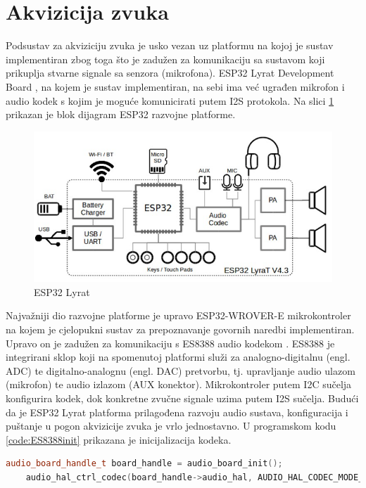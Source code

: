 \section{Akvizicija zvuka}
\label{sec:acq}

Podsustav za akviziciju zvuka je usko vezan uz platformu na kojoj
je sustav implementiran zbog toga što je zadužen za komunikaciju 
sa sustavom koji prikuplja stvarne signale sa senzora (mikrofona).
ESP32 Lyrat Development Board \cite{lyrat}, na kojem je sustav
implementiran, na sebi ima već ugrađen mikrofon i audio kodek
s kojim je moguće komunicirati putem I2S protokola. Na slici
\ref{pic:esp} prikazan je blok dijagram ESP32 razvojne platforme.

\begin{figure}[htb]
    \centering
    \includegraphics[width=0.75\linewidth]{Chapters/struktura_sustava/akvizicija/lyrat.png} 
    \caption{ESP32 Lyrat \cite{lyrat}}
    \label{pic:esp}
\end{figure}

Najvažniji dio razvojne platforme je upravo ESP32-WROVER-E mikrokontroler
na kojem je cjelopukni sustav za prepoznavanje govornih naredbi 
implementiran. Upravo on je zadužen za komunikaciju s ES8388 
audio kodekom \cite{es8388}. ES8388 je integrirani sklop koji na spomenutoj
platformi služi za analogno-digitalnu (engl. ADC) te digitalno-analognu 
(engl. DAC) pretvorbu, tj. upravljanje audio ulazom (mikrofon) te audio
izlazom (AUX konektor). Mikrokontroler putem I2C sučelja konfigurira kodek,
dok konkretne zvučne signale uzima putem I2S sučelja. Budući da je ESP32 Lyrat
platforma prilagođena razvoju audio sustava, konfiguracija i puštanje u pogon
akvizicije zvuka je vrlo jednostavno. U programskom kodu \ref{code:ES8388init}
prikazana je inicijalizacija kodeka.\\

\begin{lstlisting}[language=C++, caption=Inicijalizacija kodeka]
    audio_board_handle_t board_handle = audio_board_init();
    audio_hal_ctrl_codec(board_handle->audio_hal, AUDIO_HAL_CODEC_MODE_ENCODE, AUDIO_HAL_CTRL_START);
\end{lstlisting}
\label{code:ES8388init}

